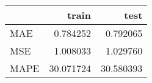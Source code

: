 \begin{tabular}{lrr}
\toprule
{} &      train &       test \\
\midrule
MAE  &   0.784252 &   0.792065 \\
MSE  &   1.008033 &   1.029760 \\
MAPE &  30.071724 &  30.580393 \\
\bottomrule
\end{tabular}
